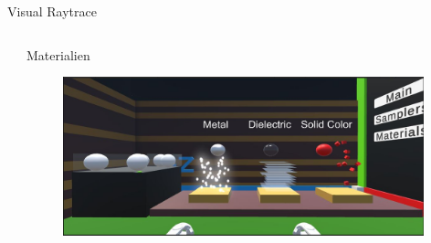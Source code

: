 \documentclass[final,hyperref={pdfpagelabels=false}]{beamer}
\begin{document}
\begin{frame}[t]
\begin{columns}[t]
\begin{column}{.96\textwidth}
\begin{block}{Visual Raytrace}
    
\end{block}

\end{column}

\begin{column}{.025\textwidth}\end{column} %

\end{columns} %



\begin{columns}[t] %

\begin{column}{.025\textwidth}\end{column} %

\begin{column}{.465\textwidth} %


\begin{block}{Materialien}
    \begin{figure}
    	\center
        \includegraphics[width=0.98\textwidth]{sphereCreating}
    \end{figure}


    

\end{block}
\end{column}
\end{columns}
\end{frame}
\end{document}
